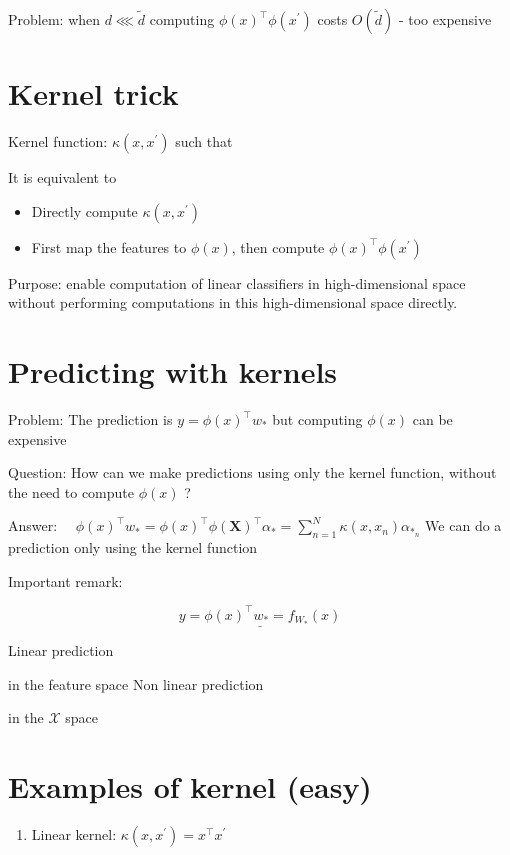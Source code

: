 Problem: when $d \lll \tilde{d}$ computing $\phi(x)^{\top} \phi\left(x^{\prime}\right)$ costs $O(\tilde{d})$ - too expensive

\section*{Kernel trick}
Kernel function: $\kappa\left(x, x^{\prime}\right)$ such that



It is equivalent to

\begin{itemize}
  \item Directly compute $\kappa\left(x, x^{\prime}\right)$
  \item First map the features to $\phi(x)$, then compute $\phi(x)^{\top} \phi\left(x^{\prime}\right)$
\end{itemize}

Purpose: enable computation of linear classifiers in high-dimensional space without performing computations in this high-dimensional space directly.

\section*{Predicting with kernels}
Problem: The prediction is $y=\phi(x)^{\top} w_{*}$ but computing $\phi(x)$ can be expensive

Question: How can we make predictions using only the kernel function, without the need to compute $\phi(x)$ ?

Answer: $\quad \phi(x)^{\top} w_{*}=\phi(x)^{\top} \phi(\mathbf{X})^{\top} \alpha_{*}=\sum_{n=1}^{N} \kappa\left(x, x_{n}\right) \alpha_{*_{n}}$ We can do a prediction only using the kernel function

Important remark:

$$
\underline{y=\phi(x)^{\top} w_{*}=f_{W_{*}}(x)}
$$

Linear prediction

in the feature space
Non linear prediction

in the $\mathscr{X}$ space

\section*{Examples of kernel (easy)}
\begin{enumerate}
  \item Linear kernel: $\kappa\left(x, x^{\prime}\right)=x^{\top} x^{\prime}$
\end{enumerate}

